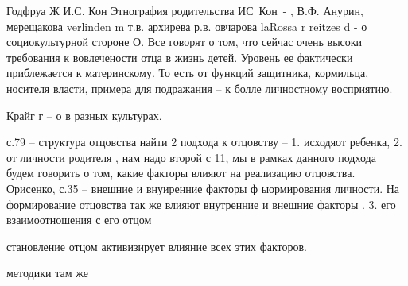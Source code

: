\documentclass{../../common/thesisbyxetex}
\begin{document}
Годфруа Ж 
И.С. Кон Этнография родительства
ИС Кон -
,
В.Ф. Анурин, мерещакова verlinden m
т.в. архирева
р.в. овчарова
laRossa r reitzes d  - о социокультурной стороне О.
Все говорят о том, что сейчас очень высоки требования к вовлечености отца в жизнь детей. Уровень ее 
фактически приблежается к материнскому. То есть от функций защитника, кормильца, носителя власти, 
примера для подражания – к болле личностному восприятию.

Крайг г – о в разных культурах.



с.79 – структура отцовства
найти
2 подхода к отцовству – 1. исходяот ребенка,
2. от личности родителя \cite[11]{psyot}, нам надо второй
с 11, мы в рамках данного подхода будем говорить о том, какие факторы влияют на реализацию 
отцовства.
Орисенко, с.35 – внешние и внуиренние факторы ф ыормирования личности. На формирование отцовства так 
же влияют внутренние и внешние факторы \cite[35]{psyot}.
3. его взаимоотношения с его отцом \cite[49]{rah}


становление отцом активизирует влияние всех этих факторов.

методики там же




\printbibliography[env=gostbibliography,sorting=ntvy]
\end{document}
